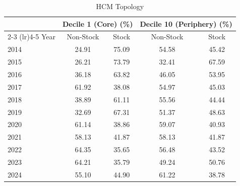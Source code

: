 \documentclass[fleqn]{rbfin}
\begin{document}
\begin{table}[!htbp]
\footnotesize
    \captionsetup{labelfont=normalfont, textfont=normalfont, justification=justified, singlelinecheck=off}
    \captionsetup[subtable]{labelfont=normalfont, textfont=normalfont, justification=centering, singlelinecheck=off}
    \centering
    
    \begin{subtable}{\textwidth}
        \centering
        \begin{tabular}{lcccc}
        \toprule
        & \multicolumn{2}{c}{Decile 1 (Core) (\%)} & \multicolumn{2}{c}{Decile 10 (Periphery) (\%)} \\
        \cmidrule(lr){2-3} \cmidrule(lr){4-5}
        Year & Non-Stock & Stock & Non-Stock & Stock \\
        \midrule
        2014 & 24.91 & 75.09 & 54.58 & 45.42 \\
        2015 & 26.21 & 73.79 & 32.41 & 67.59 \\
        2016 & 36.18 & 63.82 & 46.05 & 53.95 \\
        2017 & 61.92 & 38.08 & 54.97 & 45.03 \\
        2018 & 38.89 & 61.11 & 55.56 & 44.44 \\
        2019 & 32.69 & 67.31 & 51.37 & 48.63 \\
        2020 & 61.14 & 38.86 & 59.07 & 40.93 \\
        2021 & 58.13 & 41.87 & 58.13 & 41.87 \\
        2022 & 64.35 & 35.65 & 56.48 & 43.52 \\
        2023 & 64.21 & 35.79 & 49.24 & 50.76 \\
        2024 & 55.10 & 44.90 & 61.22 & 38.78 \\
        \bottomrule
        \end{tabular}
        \caption{HCM Topology}
    \end{subtable}
    
    \vspace{0.2em}
    

\end{table}
\end{document}
